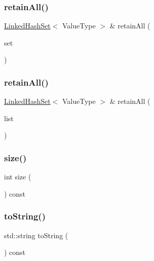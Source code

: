 \subsubsection{\texorpdfstring{retain\+All()}{retainAll()}\hspace{0.1cm}{\footnotesize\ttfamily [1/2]}}
{\footnotesize\ttfamily \mbox{\hyperlink{classLinkedHashSet}{Linked\+Hash\+Set}}$<$ Value\+Type $>$ \& retain\+All (\begin{DoxyParamCaption}\item[{const \mbox{\hyperlink{classLinkedHashSet}{Linked\+Hash\+Set}}$<$ Value\+Type $>$ \&}]{set }\end{DoxyParamCaption})}

\mbox{\label{classLinkedHashSet_abad19033b865e419b55ff11ab38cd8e3}} 
\subsubsection{\texorpdfstring{retain\+All()}{retainAll()}\hspace{0.1cm}{\footnotesize\ttfamily [2/2]}}
{\footnotesize\ttfamily \mbox{\hyperlink{classLinkedHashSet}{Linked\+Hash\+Set}}$<$ Value\+Type $>$ \& retain\+All (\begin{DoxyParamCaption}\item[{std\+::initializer\+\_\+list$<$ Value\+Type $>$}]{list }\end{DoxyParamCaption})}

\mbox{\label{classLinkedHashSet_af9593d4a5ff4274efaf429cb4f9e57cc}} 
\subsubsection{\texorpdfstring{size()}{size()}}
{\footnotesize\ttfamily int size (\begin{DoxyParamCaption}{ }\end{DoxyParamCaption}) const}

\mbox{\label{classLinkedHashSet_a1fe5121d6528fdea3f243321b3fa3a49}} 
\subsubsection{\texorpdfstring{to\+String()}{toString()}}
{\footnotesize\ttfamily std\+::string to\+String (\begin{DoxyParamCaption}{ }\end{DoxyParamCaption}) const}

